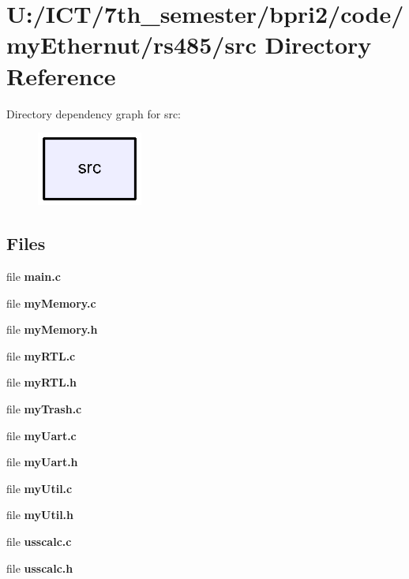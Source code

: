 \section{U\+:/\+I\+C\+T/7th\+\_\+semester/bpri2/code/my\+Ethernut/rs485/src Directory Reference}
\label{dir_68267d1309a1af8e8297ef4c3efbcdba}
Directory dependency graph for src\+:\nopagebreak
\begin{figure}[H]
\begin{center}
\leavevmode
\includegraphics[width=98pt]{dir_68267d1309a1af8e8297ef4c3efbcdba_dep}
\end{center}
\end{figure}
\subsection*{Files}
\begin{DoxyCompactItemize}
\item 
file {\bf main.\+c}
\item 
file {\bf my\+Memory.\+c}
\item 
file {\bf my\+Memory.\+h}
\item 
file {\bf my\+R\+T\+L.\+c}
\item 
file {\bf my\+R\+T\+L.\+h}
\item 
file {\bf my\+Trash.\+c}
\item 
file {\bf my\+Uart.\+c}
\item 
file {\bf my\+Uart.\+h}
\item 
file {\bf my\+Util.\+c}
\item 
file {\bf my\+Util.\+h}
\item 
file {\bf usscalc.\+c}
\item 
file {\bf usscalc.\+h}
\end{DoxyCompactItemize}
